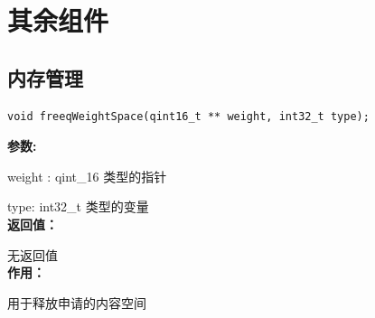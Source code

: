 \documentclass[12pt, a4paper, oneside]{ctexbook}
\begin{document}
	\section{其余组件}
		\subsection{内存管理}
		\begin{lstlisting}[numbers=none]
void freeqWeightSpace(qint16_t ** weight, int32_t type);
		\end{lstlisting}
	\textbf{参数:} \par weight : qint\_16 类型的指针 \par type: int32\_t 类型的变量 \\
	\textbf{返回值：}\par 无返回值 \\
	\textbf{作用：}\par 用于释放申请的内容空间\\
	
	
\end{document}
